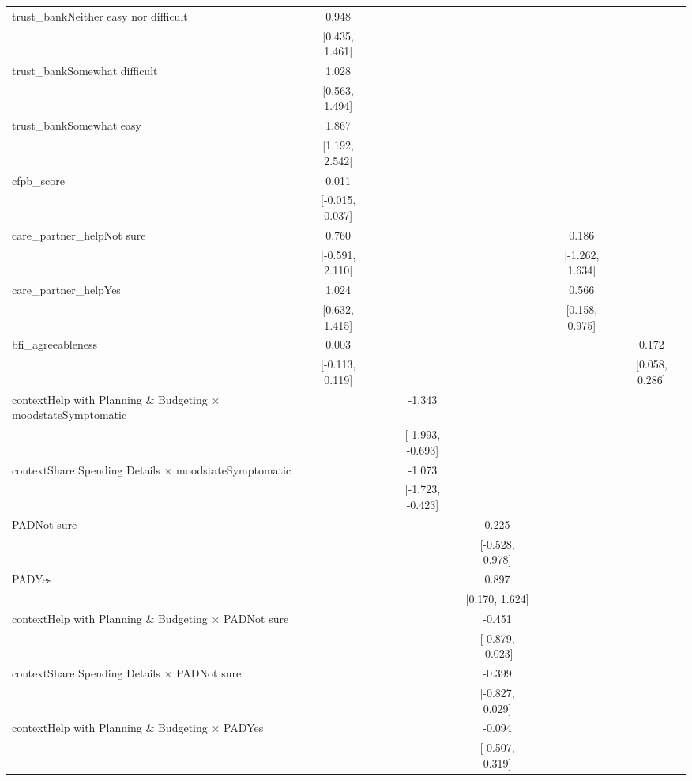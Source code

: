 \begin{tiny}
\begin{xltabular}{\textwidth}{lccccccc}
trust\_bankNeither easy nor difficult & 0.948 &  &  &  &  &  &  \\ 
 & [0.435, 1.461] &  &  &  &  &  &  \\ 
trust\_bankSomewhat difficult & 1.028 &  &  &  &  &  &  \\ 
 & [0.563, 1.494] &  &  &  &  &  &  \\ 
trust\_bankSomewhat easy & 1.867 &  &  &  &  &  &  \\ 
 & [1.192, 2.542] &  &  &  &  &  &  \\ 
cfpb\_score & 0.011 &  &  &  &  &  &  \\ 
 & [-0.015, 0.037] &  &  &  &  &  &  \\ 
care\_partner\_helpNot sure & 0.760 &  &  &  &  & 0.186 &  \\ 
 & [-0.591, 2.110] &  &  &  &  & [-1.262, 1.634] &  \\ 
care\_partner\_helpYes & 1.024 &  &  &  &  & 0.566 &  \\ 
 & [0.632, 1.415] &  &  &  &  & [0.158, 0.975] &  \\ 
bfi\_agreeableness & 0.003 &  &  &  &  &  & 0.172 \\ 
 & [-0.113, 0.119] &  &  &  &  &  & [0.058, 0.286] \\ 
contextHelp with Planning \& Budgeting × moodstateSymptomatic &  &  & -1.343 &  &  &  &  \\ 
 &  &  & [-1.993, -0.693] &  &  &  &  \\ 
contextShare Spending Details × moodstateSymptomatic &  &  & -1.073 &  &  &  &  \\ 
 &  &  & [-1.723, -0.423] &  &  &  &  \\ 
PADNot sure &  &  &  & 0.225 &  &  &  \\ 
 &  &  &  & [-0.528, 0.978] &  &  &  \\ 
PADYes &  &  &  & 0.897 &  &  &  \\ 
 &  &  &  & [0.170, 1.624] &  &  &  \\ 
contextHelp with Planning \& Budgeting × PADNot sure &  &  &  & -0.451 &  &  &  \\ 
 &  &  &  & [-0.879, -0.023] &  &  &  \\ 
contextShare Spending Details × PADNot sure &  &  &  & -0.399 &  &  &  \\ 
 &  &  &  & [-0.827, 0.029] &  &  &  \\ 
contextHelp with Planning \& Budgeting × PADYes &  &  &  & -0.094 &  &  &  \\ 
 &  &  &  & [-0.507, 0.319] &  &  &  \\ 

\end{xltabular}
\end{tiny}
